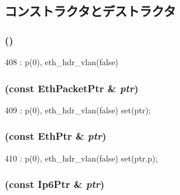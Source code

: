 \subsection{コンストラクタとデストラクタ}
\hypertarget{classNet_1_1Ip6Ptr_a75d6a7523173f72c88514ee711268901}{
\subsubsection[{Ip6Ptr}]{ ()}}
\label{classNet_1_1Ip6Ptr_a75d6a7523173f72c88514ee711268901}



\begin{DoxyCode}
408 : p(0), eth_hdr_vlan(false) {}
\end{DoxyCode}
\hypertarget{classNet_1_1Ip6Ptr_a90edf6d8ac8b0716f364984dab646a17}{
\subsubsection[{Ip6Ptr}]{ (const {\bf EthPacketPtr} \& {\em ptr})}}
\label{classNet_1_1Ip6Ptr_a90edf6d8ac8b0716f364984dab646a17}



\begin{DoxyCode}
409 : p(0), eth_hdr_vlan(false) { set(ptr); }
\end{DoxyCode}
\hypertarget{classNet_1_1Ip6Ptr_a03be662680a7d23572b2adc19a93632c}{
\subsubsection[{Ip6Ptr}]{ (const {\bf EthPtr} \& {\em ptr})}}
\label{classNet_1_1Ip6Ptr_a03be662680a7d23572b2adc19a93632c}



\begin{DoxyCode}
410 : p(0), eth_hdr_vlan(false) { set(ptr.p); }
\end{DoxyCode}
\hypertarget{classNet_1_1Ip6Ptr_af64998b77b2440221f41c0d58a9fd829}{
\subsubsection[{Ip6Ptr}]{ (const {\bf Ip6Ptr} \& {\em ptr})}}
\label{classNet_1_1Ip6Ptr_af64998b77b2440221f41c0d58a9fd829}



